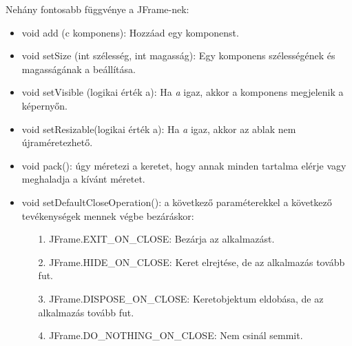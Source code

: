 \noindent Nehány fontosabb függvénye a JFrame-nek:
\begin{itemize}
    \item void add (c komponens): Hozzáad egy komponenst.
    \item void setSize (int szélesség, int magasság): Egy komponens szélességének és magasságának a beállítása.
    \item void setVisible (logikai érték a): Ha \textit{a} igaz, akkor a komponens megjelenik a képernyőn.
    \item void setResizable(logikai érték a): Ha \textit{a} igaz, akkor az ablak nem újraméretezhető.
    \item void pack(): úgy méretezi a keretet, hogy annak minden tartalma elérje vagy meghaladja a kívánt méretet.
    \item void setDefaultCloseOperation(): a következő paraméterekkel a következő tevékenységek mennek végbe bezáráskor:
    \begin{itemize}
        \item[1.] JFrame.EXIT\_ON\_CLOSE: Bezárja az alkalmazást.
        \item[2.] JFrame.HIDE\_ON\_CLOSE: Keret elrejtése, de az alkalmazás tovább fut.
        \item[3.] JFrame.DISPOSE\_ON\_CLOSE: Keretobjektum eldobása, de az alkalmazás tovább fut.
        \item[4.] JFrame.DO\_NOTHING\_ON\_CLOSE: Nem csinál semmit.
    \end{itemize}
\end{itemize}
